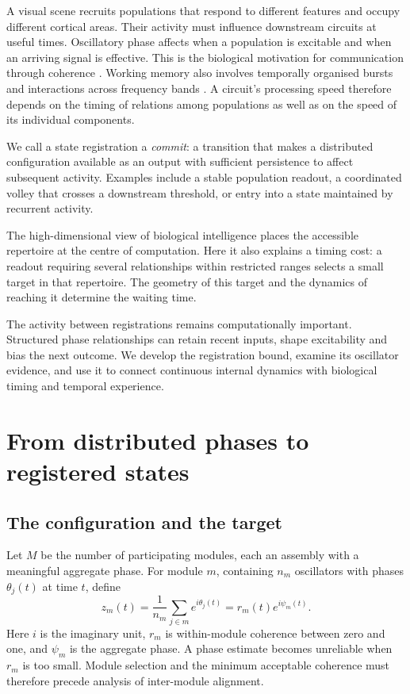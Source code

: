 \documentclass[11pt]{article}
\begin{document}
A visual scene recruits populations that respond to different features and
occupy different cortical areas. Their activity must influence downstream
circuits at useful times. Oscillatory phase affects when a population is
excitable and when an arriving signal is effective. This is the biological
motivation for communication through coherence
\cite{fries2005,fries2015,womelsdorf2007}. Working memory also involves
temporally organised bursts and interactions across frequency bands
\cite{miller2018,lundqvist2016,lisman2013}. A circuit's processing speed
therefore depends on the timing of relations among populations as well as on
the speed of its individual components.

We call a state registration a \emph{commit}: a transition that makes a
distributed configuration available as an output with sufficient persistence
to affect subsequent activity. Examples include a stable population readout,
a coordinated volley that crosses a downstream threshold, or entry into a
state maintained by recurrent activity.

The high-dimensional view of biological intelligence
\cite{todd2025intelligence} places the accessible repertoire at the centre
of computation. Here it also explains a timing cost: a readout requiring
several relationships within restricted ranges selects a small target in
that repertoire. The geometry of this target and the dynamics of reaching
it determine the waiting time.

The activity between registrations remains computationally important.
Structured phase relationships can retain recent inputs, shape
excitability and bias the next outcome. We develop the registration bound,
examine its oscillator evidence, and use it to connect continuous internal
dynamics with biological timing and temporal experience.

\section{From distributed phases to registered states}
\subsection{The configuration and the target}

Let $M$ be the number of participating modules, each an assembly with a
meaningful aggregate phase. For module $m$, containing $n_m$ oscillators
with phases $\theta_j(t)$ at time $t$, define
\begin{equation}
 z_m(t)=\frac{1}{n_m}\sum_{j\in m}e^{i\theta_j(t)}
       =r_m(t)e^{i\psi_m(t)}.
 \label{eq:module}
\end{equation}
Here $i$ is the imaginary unit, $r_m$ is within-module coherence between
zero and one, and $\psi_m$ is the aggregate phase. A phase estimate becomes
unreliable when $r_m$ is too small. Module selection and the minimum
acceptable coherence must therefore precede analysis of inter-module
alignment.
\end{document}
